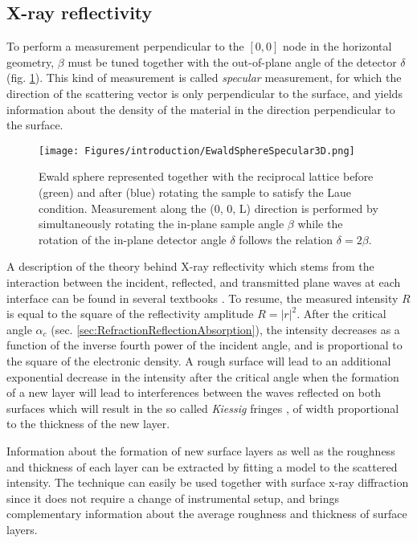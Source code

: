 \subsection{X-ray reflectivity}\label{sec:XRR}

To perform a measurement perpendicular to the $[0, 0]$ node in the horizontal geometry, $\beta$ must be tuned together with the out-of-plane angle of the detector $\delta$ (fig. \ref{fig:EwaldSphereSpecular}).
This kind of measurement is called \textit{specular} measurement, for which the direction of the scattering vector is only perpendicular to the surface, and yields information about the density of the material in the direction perpendicular to the surface.

\begin{figure}[!htb]
    \centering
    \texttt{[image: Figures/introduction/EwaldSphereSpecular3D.png]}
    \caption{
    Ewald sphere represented together with the reciprocal lattice before (green) and after (blue) rotating the sample to satisfy the Laue condition.
    Measurement along the (0, 0, L) direction is performed by simultaneously rotating the in-plane sample angle $\beta$ while the rotation of the in-plane detector angle $\delta$ follows the relation $\delta=2\beta$.
    }
    \label{fig:EwaldSphereSpecular}
\end{figure}

A description of the theory behind X-ray reflectivity which stems from the interaction between the incident, reflected, and transmitted plane waves at each interface can be found in several textbooks \parencite{Willmott}.
To resume, the measured intensity $R$ is equal to the square of the reflectivity amplitude $R=|r|^2$.
After the critical angle $\alpha_c$ (sec. \ref{sec:RefractionReflectionAbsorption}), the intensity decreases as a function of the inverse fourth power of the incident angle, and is proportional to the square of the electronic density.
A rough surface will lead to an additional exponential decrease in the intensity after the critical angle when the formation of a new layer will lead to interferences between the waves reflected on both surfaces which will result in the so called \textit{Kiessig} fringes \parencite{Kiessig1931}, of width proportional to the thickness of the new layer.

Information about the formation of new surface layers as well as the roughness and thickness of each layer can be extracted by fitting a model to the scattered intensity.
The technique can easily be used together with surface x-ray diffraction since it does not require a change of instrumental setup, and brings complementary information about the average roughness and thickness of surface layers.